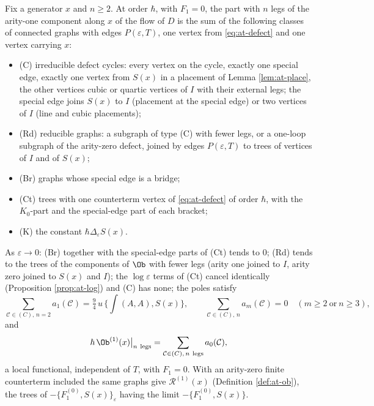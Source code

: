 \begin{theorem}
\label{thm:at-classes}
Fix a generator $x$ and $n\ge2$. At order $\hbar$, with $F_1=0$, the part with $n$ legs of the arity-one component along $x$ of the flow of $D$ is the sum of the following classes of connected graphs with edges $P(\varepsilon,T)$, one vertex from \eqref{eq:at-defect} and one vertex carrying $x$:
\begin{itemize}
\item (C) irreducible defect cycles: every vertex on the cycle, exactly one special edge, exactly one vertex from $S(x)$ in a placement of Lemma \ref{lem:at-place}, the other vertices cubic or quartic vertices of $I$ with their external legs; the special edge joins $S(x)$ to $I$ (placement at the special edge) or two vertices of $I$ (line and cubic placements);
\item (Rd) reducible graphs: a subgraph of type (C) with fewer legs, or a one-loop subgraph of the arity-zero defect, joined by edges $P(\varepsilon,T)$ to trees of vertices of $I$ and of $S(x)$;
\item (Br) graphs whose special edge is a bridge;
\item (Ct) trees with one counterterm vertex of \eqref{eq:at-defect} of order $\hbar$, with the $K_0$-part and the special-edge part of each bracket;
\item (K) the constant $\hbar\Delta_\varepsilon S(x)$.
\end{itemize}
As $\varepsilon\to0$: (Br) together with the special-edge parts of (Ct) tends to $0$; (Rd) tends to the trees of the components of $\Ob$ with fewer legs (arity one joined to $I$, arity zero joined to $S(x)$ and $I$); the $\log\varepsilon$ terms of (Ct) cancel identically (Proposition \ref{prop:at-log}) and (C) has none; the poles satisfy
\begin{equation}
\sum_{\mathcal C\in(C),\,n=2}a_1(\mathcal C)=\tfrac94\,u\,\Big\{\int(A,A),S(x)\Big\},\qquad \sum_{\mathcal C\in(C),\,n}a_m(\mathcal C)=0\quad(m\ge2\ \text{or}\ n\ge3),
\label{eq:at-pole}
\end{equation}
and
\begin{equation}
\hbar\,\Ob^{(1)}(x)\big|_{n\ \text{legs}}=\sum_{\mathcal C\in(C),\,n\ \text{legs}}a_0(\mathcal C),
\label{eq:at-localformula}
\end{equation}
a local functional, independent of $T$, with $F_1=0$. With an arity-zero finite counterterm included the same graphs give $\mathcal R^{(1)}(x)$ (Definition \ref{def:at-ob}), the trees of $-\{F_1^{(0)},S(x)\}_\varepsilon$ having the limit $-\{F_1^{(0)},S(x)\}$.
\end{theorem}

